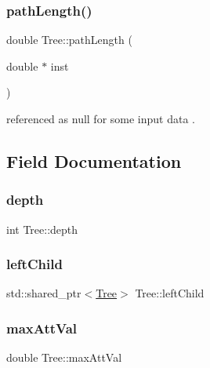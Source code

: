 \mbox{\label{classTree_ad4fdb18020ffddf0250baeeaaaf4e3b5}} 
\subsubsection{\texorpdfstring{path\+Length()}{pathLength()}}
{\footnotesize\ttfamily double Tree\+::path\+Length (\begin{DoxyParamCaption}\item[{double $\ast$}]{inst }\end{DoxyParamCaption})}

referenced as null for some input data . 

\subsection{Field Documentation}
\mbox{\label{classTree_aee829f12b9755333a0196190fbe07f1b}} 
\subsubsection{\texorpdfstring{depth}{depth}}
{\footnotesize\ttfamily int Tree\+::depth\hspace{0.3cm}{\ttfamily [private]}}

\mbox{\label{classTree_a6fcca508488527e9028456375504e51e}} 
\subsubsection{\texorpdfstring{left\+Child}{leftChild}}
{\footnotesize\ttfamily std\+::shared\+\_\+ptr$<$\hyperlink{classTree}{Tree}$>$ Tree\+::left\+Child\hspace{0.3cm}{\ttfamily [private]}}

\mbox{\label{classTree_a4434a97ce3969349d711c0830df1661c}} 
\subsubsection{\texorpdfstring{max\+Att\+Val}{maxAttVal}}
{\footnotesize\ttfamily double Tree\+::max\+Att\+Val\hspace{0.3cm}{\ttfamily [private]}}

